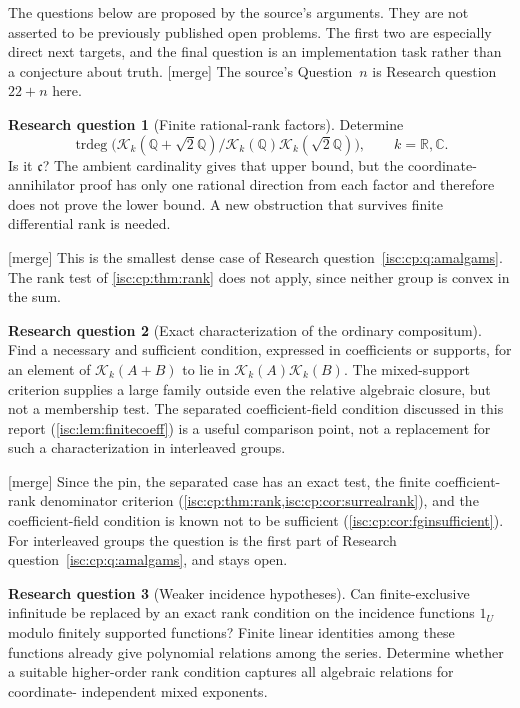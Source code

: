 \documentclass[11pt,letterpaper]{article}
\theoremstyle{definition}
\newtheorem{question}{Research question}
\theoremstyle{remark}
\newcommand{\R}{\mathbb R}
\newcommand{\C}{\mathbb C}
\newcommand{\Q}{\mathbb Q}
\newcommand{\K}[2]{\mathcal K_{#1}(#2)}
\newcommand{\trdeg}{\operatorname{trdeg}}
\newcommand{\mtag}{\textup{[merge]}}%
\newcommand{\cc}{\mathfrak c}
\numberwithin{equation}{section}
\begin{document}
The questions below are proposed by the source's arguments. They are not
asserted to be previously published open problems. The first two are
especially direct next targets, and the final question is an
implementation task rather than a conjecture about truth.
\mtag{} The source's Question~$n$ is Research question~$22+n$ here.

\begin{question}[Finite rational-rank factors]\label{isc:hj:q:rankone}
Determine
\[
 \trdeg\bigl(\K{k}{\Q+\sqrt2\Q}/
              \K{k}{\Q}\K{k}{\sqrt2\Q}\bigr),\qquad k=\R,\C.
\]
Is it $\cc$? The ambient cardinality gives that upper bound, but the
coordinate-annihilator proof has only one rational direction from each
factor and therefore does not prove the lower bound. A new obstruction
that survives finite differential rank is needed.
\end{question}
\mtag{} This is the smallest dense case of
Research question~\ref{isc:cp:q:amalgams}. The rank test of
\cref{isc:cp:thm:rank} does not apply, since neither group is convex in
the sum.

\begin{question}[Exact characterization of the ordinary compositum]\label{isc:hj:q:characterization}
Find a necessary and sufficient condition, expressed in coefficients or
supports, for an element of $\K{k}{A+B}$ to lie in
$\K{k}{A}\K{k}{B}$. The mixed-support criterion supplies a large
family outside even the relative algebraic closure, but not a
membership test. The separated coefficient-field condition discussed
in this report (\cref{isc:lem:finitecoeff}) is a useful comparison point,
not a replacement for such a characterization in interleaved groups.
\end{question}
\mtag{} Since the pin, the separated case has an exact test, the finite
coefficient-rank denominator criterion (\cref{isc:cp:thm:rank,isc:cp:cor:surrealrank}),
and the coefficient-field condition is known not to be sufficient
(\cref{isc:cp:cor:fginsufficient}). For interleaved groups the question is
the first part of Research question~\ref{isc:cp:q:amalgams}, and stays open.

\begin{question}[Weaker incidence hypotheses]\label{isc:hj:q:incidence}
Can finite-exclusive infinitude be replaced by an exact rank condition
on the incidence functions $1_U$ modulo finitely supported functions?
Finite linear identities among these functions already give polynomial
relations among the series. Determine whether a suitable higher-order
rank condition captures all algebraic relations for coordinate-
independent mixed exponents.
\end{question}
\end{document}
